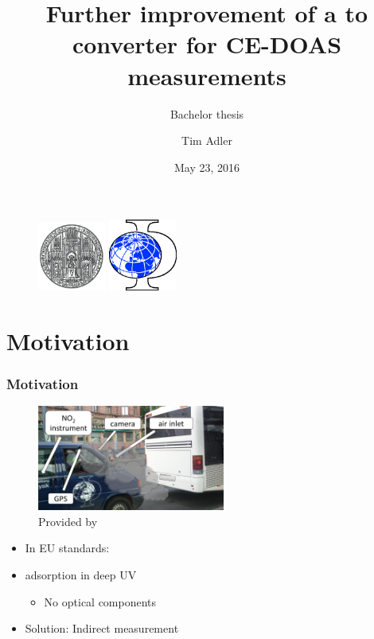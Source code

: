\documentclass[english]{beamer}
\title[Improvement of a \ch{NO} converter]{Further improvement of a \ch{NO}
  to \ch{NO2} converter for CE-DOAS measurements}
\subtitle{Bachelor thesis}
\institute[]{Institute of Environmental Physics\\Heidelberg University}
\author{Tim Adler}
\date{May 23, 2016}
\begin{document}
\begin{frame}
  \titlepage
  \begin{figure}[htbp]
    \centering
    \includegraphics[width=0.2\textwidth]{images/unilogo.png}
    \hspace{1.5cm}
    \includegraphics[width=0.2\textwidth]{images/LogoIUP.eps}
  \end{figure}
\end{frame}

\section{Motivation}

\begin{frame}
  \frametitle{Motivation}

  \begin{figure}[htbp]
    \centering
    \includegraphics[width=0.55\textwidth]{vehicle_principle.jpg}
    \caption{Provided by \cite{denis}}
  \end{figure}

  \begin{itemize}
  \item In EU standards: 
  \item {} adsorption in deep UV
    \begin{itemize}
    \item No optical components
    \end{itemize}
  \item Solution: Indirect measurement
  \end{itemize}
\end{frame}
\end{document}

